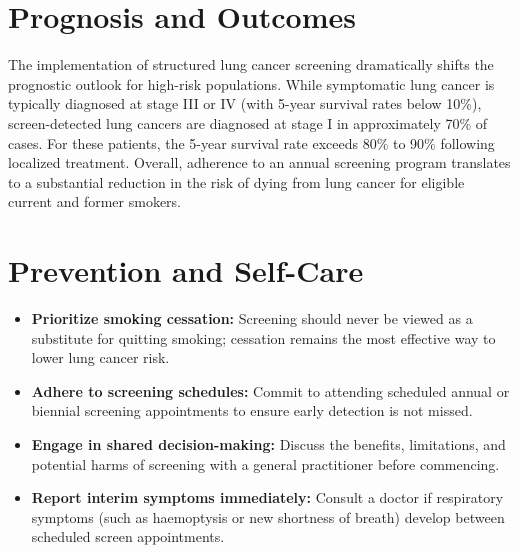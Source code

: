 \section*{Prognosis and Outcomes}
The implementation of structured lung cancer screening dramatically shifts the prognostic outlook for high-risk populations. While symptomatic lung cancer is typically diagnosed at stage III or IV (with 5-year survival rates below 10\%), screen-detected lung cancers are diagnosed at stage I in approximately 70\% of cases. For these patients, the 5-year survival rate exceeds 80\% to 90\% following localized treatment. Overall, adherence to an annual screening program translates to a substantial reduction in the risk of dying from lung cancer for eligible current and former smokers.

\section*{Prevention and Self-Care}
\begin{itemize}
    \item \textbf{Prioritize smoking cessation:} Screening should never be viewed as a substitute for quitting smoking; cessation remains the most effective way to lower lung cancer risk.
    \item \textbf{Adhere to screening schedules:} Commit to attending scheduled annual or biennial screening appointments to ensure early detection is not missed.
    \item \textbf{Engage in shared decision-making:} Discuss the benefits, limitations, and potential harms of screening with a general practitioner before commencing.
    \item \textbf{Report interim symptoms immediately:} Consult a doctor if respiratory symptoms (such as haemoptysis or new shortness of breath) develop between scheduled screen appointments.
\end{itemize}

